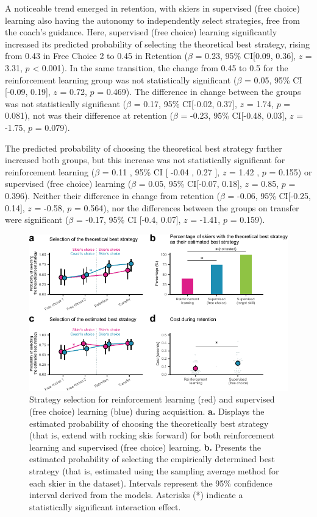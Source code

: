 \documentclass[pdflatex,sn-mathphys-num]{sn-jnl}%
\theoremstyle{thmstyleone}%
\theoremstyle{thmstyletwo}%
\theoremstyle{thmstylethree}%
\begin{document}
A noticeable trend emerged in retention, with skiers in supervised (free choice) learning also having the autonomy to independently select strategies, free from the coach's guidance. Here, supervised (free choice) learning significantly increased its predicted probability of selecting the theoretical best strategy, rising from 0.43 in Free Choice 2 to 0.45 in Retention ($\beta$ = 0.23, 95\% CI[0.09, 0.36], $z$ = 3.31, $p$ < 0.001). In the same transition, the change from 0.45 to 0.5 for the reinforcement learning group was not statistically significant ($\beta$ = 0.05, 95\% CI [-0.09, 0.19], $z$ = 0.72, $p$ = 0.469). The difference in change between the groups was not statistically significant ($\beta$ = 0.17, 95\% CI[-0.02,  0.37], $z$ = 1.74, $p$ = 0.081), not was their difference at retention ($\beta$ = -0.23, 95\% CI[-0.48, 0.03], $z$ = -1.75, $p$ = 0.079).

The predicted probability of choosing the theoretical best strategy further increased both groups, but this increase was not statistically significant for reinforcement learning ($\beta$ = 0.11 , 95\% CI [ -0.04 ,  0.27 ], $z$ = 1.42 , $p$  =  0.155) or supervised (free choice) learning ($\beta$ = 0.05, 95\% CI[-0.07, 0.18], $z$ = 0.85, $p$ = 0.396). Neither their difference in change from retention ($\beta$ = -0.06, 95\% CI[-0.25, 0.14], $z$ = -0.58, $p$  =  0.564), nor the differences between the groups on transfer were significant ($\beta$ = -0.17, 95\% CI [-0.4, 0.07], $z$ = -1.41, $p$ = 0.159).


\begin{figure}[H]
\centering
\includegraphics{figures/figure_choice_estimated_4.pdf}
\caption{Strategy selection for reinforcement learning (red) and supervised (free choice) learning (blue) during acquisition. \textbf{a.} Displays the estimated probability of choosing the theoretically best strategy (that is, extend with rocking skis forward) for both reinforcement learning and supervised (free choice) learning. \textbf{b.} Presents the estimated probability of selecting the empirically determined best strategy (that is, estimated using the sampling average method for each skier in the dataset). Intervals represent the 95\% confidence interval derived from the models. Asterisks (*) indicate a statistically significant interaction effect.}\label{fig: choice_estimated}
\end{figure}
\end{document}

